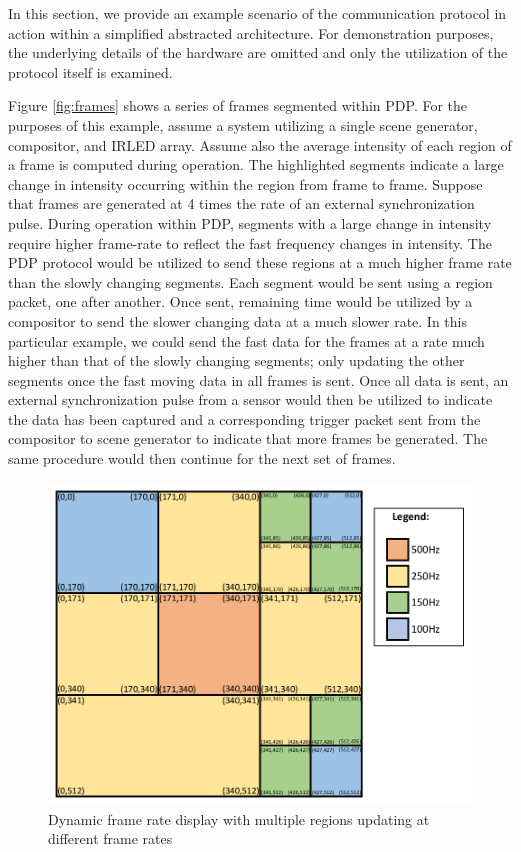In this section, we provide an example scenario of the communication protocol in action within a simplified abstracted architecture. For demonstration purposes, the underlying details of the hardware are omitted and only the utilization of the protocol itself is examined.

Figure \ref{fig:frames} shows a series of frames segmented within PDP. For the purposes of this example, assume a system utilizing a single scene generator, compositor, and IRLED array. Assume also the average intensity of each region of a frame is computed during operation. The highlighted segments indicate a large change in intensity occurring within the region from frame to frame. Suppose that frames are generated at 4 times the rate of an external synchronization pulse. During operation within PDP, segments with a large change in intensity require higher frame-rate to reflect the fast frequency changes in intensity. The PDP protocol would be utilized to send these regions at a much higher frame rate than the slowly changing segments. Each segment would be sent using a region packet, one after another. Once sent, remaining time would be utilized by a compositor to send the slower changing data at a much slower rate. In this particular example, we could send the fast data for the frames at a rate much higher than that of the slowly changing segments; only updating the other segments once the fast moving data in all frames is sent. Once all data is sent, an external synchronization pulse from a sensor would then be utilized to indicate the data has been captured and a corresponding trigger packet sent from the compositor to scene generator to indicate that more frames be generated. The same procedure would then continue for the next set of frames.

\begin{figure}
    \centering
        \centering
        \includegraphics[width=1.0\textwidth]{fig/variable_display.pdf}
        \caption{Dynamic frame rate display with multiple regions updating at different frame rates}
        \label{fig:variable_display}
\end{figure}

